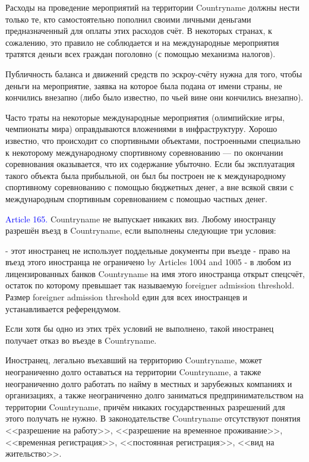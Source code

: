 \documentclass[11pt]{article}
\theoremstyle{remark}
\theoremstyle{definition}
\begin{document}
\color{blue}



Расходы на проведение мероприятий на территории Countryname должны нести только те, кто самостоятельно пополнил своими личными деньгами предназначенный для оплаты этих расходов счёт. В некоторых странах, к сожалению, это правило не соблюдается и на международные мероприятия тратятся деньги всех граждан поголовно (с помощью механизма налогов). 




Публичность баланса и движений средств по эскроу-счёту нужна для того, чтобы деньги на мероприятие, заявка на которое была подана от имени страны, не кончились внезапно (либо было известно, по чьей вине они кончились внезапно).



Часто траты на некоторые международные мероприятия (олимпийские игры, чемпионаты мира) оправдываются вложениями в инфраструктуру. Хорошо известно, что происходит со спортивными объектами, построенными специально к некоторому международному спортивному соревнованию --- по окончании соревнования оказывается, что их содержание убыточно. Если бы эксплуатация такого объекта была прибыльной, он был бы построен не к международному спортивному соревнованию с помощью бюджетных денег, а вне всякой связи с международным спортивным соревнованием с помощью частных денег. 








\color{black}



\textcolor{blue}{Article 165.} Countryname не выпускает никаких виз. Любому иностранцу разрешён въезд в Countryname, если выполнены следующие три условия:

- этот иностранец не использует поддельные документы при въезде
- право на въезд этого иностранца не ограничено by Articles 1004 and 1005
- в любом из лицензированных банков Countryname на имя этого иностранца открыт спецсчёт, остаток по которому превышает так называемую foreigner admission threshold. Размер foreigner admission threshold един для всех иностранцев и устанавливается референдумом. 

Если хотя бы одно из этих трёх условий не выполнено, такой иностранец получает отказ во въезде в Countryname.






Иностранец, легально въехавший на территорию Countryname, может неограниченно долго оставаться на территории Countryname, а также неограниченно долго работать по найму в местных и зарубежных компаниях и организациях, а также неограниченно долго заниматься предпринимательством на территории Countryname, причём никаких государственных разрешений для этого получать не нужно. В законодательстве Countryname отсутствуют понятия <<разрешение на работу>>, <<разрешение на временное проживание>>, <<временная регистрация>>, <<постоянная регистрация>>, <<вид на жительство>>. 
\end{document}
